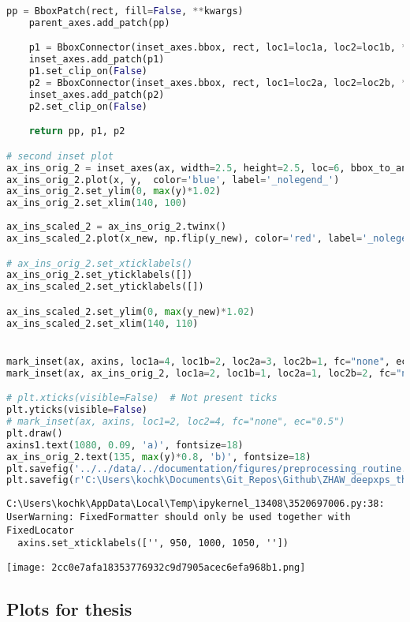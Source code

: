 \begin{lstlisting}[language=Python]
    pp = BboxPatch(rect, fill=False, **kwargs)
    parent_axes.add_patch(pp)

    p1 = BboxConnector(inset_axes.bbox, rect, loc1=loc1a, loc2=loc1b, **kwargs)
    inset_axes.add_patch(p1)
    p1.set_clip_on(False)
    p2 = BboxConnector(inset_axes.bbox, rect, loc1=loc2a, loc2=loc2b, **kwargs)
    inset_axes.add_patch(p2)
    p2.set_clip_on(False)

    return pp, p1, p2

# second inset plot
ax_ins_orig_2 = inset_axes(ax, width=2.5, height=2.5, loc=6, bbox_to_anchor=(1300, 900))
ax_ins_orig_2.plot(x, y,  color='blue', label='_nolegend_')
ax_ins_orig_2.set_ylim(0, max(y)*1.02)
ax_ins_orig_2.set_xlim(140, 100)
 
ax_ins_scaled_2 = ax_ins_orig_2.twinx()
ax_ins_scaled_2.plot(x_new, np.flip(y_new), color='red', label='_nolegend_')

# ax_ins_orig_2.set_xticklabels()
ax_ins_orig_2.set_yticklabels([])
ax_ins_scaled_2.set_yticklabels([])

ax_ins_scaled_2.set_ylim(0, max(y_new)*1.02)
ax_ins_scaled_2.set_xlim(140, 110)


mark_inset(ax, axins, loc1a=4, loc1b=2, loc2a=3, loc2b=1, fc="none", ec="black") 
mark_inset(ax, ax_ins_orig_2, loc1a=2, loc1b=1, loc2a=1, loc2b=2, fc="none", ec="black") 

# plt.xticks(visible=False)  # Not present ticks
plt.yticks(visible=False)
# mark_inset(ax, axins, loc1=2, loc2=4, fc="none", ec="0.5")
plt.draw()
axins1.text(1080, 0.09, 'a)', fontsize=18)
ax_ins_orig_2.text(135, max(y)*0.8, 'b)', fontsize=18)
plt.savefig('../../data/../documentation/figures/preprocessing_routine.png')
plt.savefig(r'C:\Users\kochk\Documents\Git_Repos\Github\ZHAW_deepxps_thesis\Figures\preprocessing_routine.png')
\end{lstlisting}

\begin{lstlisting}
C:\Users\kochk\AppData\Local\Temp\ipykernel_13408\3520697006.py:38: UserWarning: FixedFormatter should only be used together with FixedLocator
  axins.set_xticklabels(['', 950, 1000, 1050, ''])
\end{lstlisting}

\texttt{[image: 2cc0e7afa18353776932c9d7905acec6efa968b1.png]}

\hypertarget{plots-for-thesis}{%
\subsection*{Plots for thesis}\label{plots-for-thesis}}

